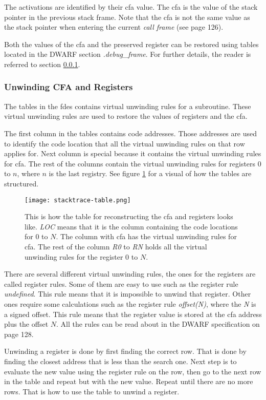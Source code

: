 The activations are identified by their \gls{cfa} value. 
The \gls{cfa} is the value of the stack pointer in the previous stack frame.
Note that the \gls{cfa} is not the same value as the stack pointer when entering the current \emph{call frame} (see \cite{dwarf} page 126).


Both the values of the \gls{cfa} and the preserved register can be restored using tables located in the \gls{DWARF} section \emph{.debug\_frame}.
For further details, the reader is referred to section \ref{sec:evalcfa}.



\subsubsection{Unwinding CFA and Registers} \label{sec:evalcfa}
The tables in the \glspl{fde} contains virtual unwinding rules for a subroutine.
These virtual unwinding rules are used to restore the values of registers and the \gls{cfa}.


The first column in the tables contains code addresses.
Those addresses are used to identify the code location that all the virtual unwinding rules on that row applies for.
Next column is special because it contains the virtual unwinding rules for \gls{cfa}.
The rest of the columns contain the virtual unwinding rules for registers $0$ to $n$, where $n$ is the last registry.
See figure \ref{fig:stacktracetable} for a visual of how the tables are structured.


\begin{figure}[h]
	\centering
	\texttt{[image: stacktrace-table.png]}
	\caption{This is how the table for reconstructing the \gls{cfa} and registers looks like. \emph{LOC} means that it is the column containing the code locations for $0$ to $N$. The column with \gls{cfa} has the virtual unwinding rules for \gls{cfa}. The rest of the column \emph{R0} to \emph{RN} holds all the virtual unwinding rules for the register $0$ to $N$.}
	\label{fig:stacktracetable}
\end{figure}


There are several different virtual unwinding rules, the ones for the registers are called register rules.
Some of them are easy to use such as the register rule \emph{undefined}.
This rule means that it is impossible to unwind that register.
Other ones require some calculations such as the register rule \emph{offset(N)}, where the \emph{N} is a signed offset.
This rule means that the register value is stored at the \gls{cfa} address plus the offset $N$.
All the rules can be read about in the \gls{DWARF} specification \cite{dwarf} on page 128.


Unwinding a register is done by first finding the correct row.
That is done by finding the closest address that is less than the search one.
Next step is to evaluate the new value using the register rule on the row, then go to the next row in the table and repeat but with the new value.
Repeat until there are no more rows.
That is how to use the table to unwind a register.
